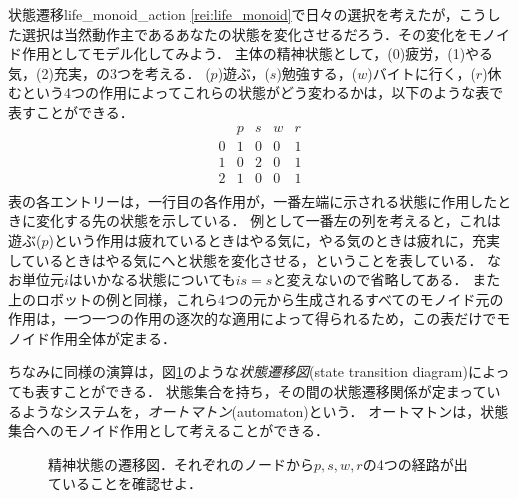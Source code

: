 \documentclass[11pt,a4paper, dvipdfmx]{jsarticle}
\begin{document}
\begin{rei}{状態遷移}{life_monoid_action}
    \ref{rei:life_monoid}で日々の選択を考えたが，こうした選択は当然動作主であるあなたの状態を変化させるだろう．その変化をモノイド作用としてモデル化してみよう．
    主体の精神状態として，(0)疲労，(1)やる気，(2)充実，の3つを考える．
    ($p$)遊ぶ，($s$)勉強する，($w$)バイトに行く，($r$)休むという4つの作用によってこれらの状態がどう変わるかは，以下のような表で表すことができる．
    \[
        \begin{array}{c|cccc}
               & p & s & w & r \\ \hline
             0 & 1 & 0 & 0 & 1 \\
             1 & 0 & 2 & 0 & 1 \\ 
             2 & 1 & 0 & 0 & 1 \\
        \end{array}
    \]
    表の各エントリーは，一行目の各作用が，一番左端に示される状態に作用したときに変化する先の状態を示している．
    例として一番左の列を考えると，これは遊ぶ($p$)という作用は疲れているときはやる気に，やる気のときは疲れに，充実しているときはやる気にへと状態を変化させる，ということを表している．
    なお単位元$i$はいかなる状態についても$is = s$と変えないので省略してある．
    また上のロボットの例と同様，これら4つの元から生成されるすべてのモノイド元の作用は，一つ一つの作用の逐次的な適用によって得られるため，この表だけでモノイド作用全体が定まる．
\end{rei}

ちなみに同様の演算は，図\ref{life_state}のような\emph{状態遷移図}(state transition diagram)によっても表すことができる．
状態集合を持ち，その間の状態遷移関係が定まっているようなシステムを，\emph{オートマトン}(automaton)という．
オートマトンは，状態集合へのモノイド作用として考えることができる．

\begin{figure}[t]
    \begin{center}
      \end{center}
      \caption{精神状態の遷移図．それぞれのノードから$p,s,w,r$の4つの経路が出ていることを確認せよ．}
      \label{life_state}
\end{figure}
\end{document}
